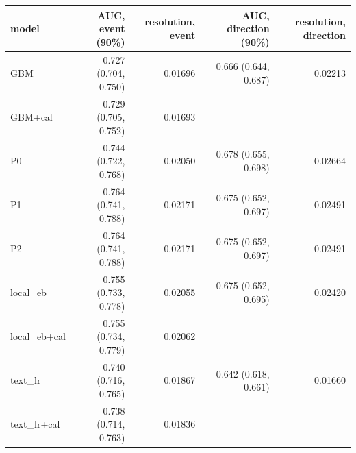 \begin{tabular}{lrrrr}
\toprule
model & AUC, event (90\%) & resolution, event & AUC, direction (90\%) & resolution, direction \\
\midrule
GBM & 0.727 (0.704, 0.750) & 0.01696 & 0.666 (0.644, 0.687) & 0.02213 \\
GBM+cal & 0.729 (0.705, 0.752) & 0.01693 &  &  \\
P0 & 0.744 (0.722, 0.768) & 0.02050 & 0.678 (0.655, 0.698) & 0.02664 \\
P1 & 0.764 (0.741, 0.788) & 0.02171 & 0.675 (0.652, 0.697) & 0.02491 \\
P2 & 0.764 (0.741, 0.788) & 0.02171 & 0.675 (0.652, 0.697) & 0.02491 \\
local\_eb & 0.755 (0.733, 0.778) & 0.02055 & 0.675 (0.652, 0.695) & 0.02420 \\
local\_eb+cal & 0.755 (0.734, 0.779) & 0.02062 &  &  \\
text\_lr & 0.740 (0.716, 0.765) & 0.01867 & 0.642 (0.618, 0.661) & 0.01660 \\
text\_lr+cal & 0.738 (0.714, 0.763) & 0.01836 &  &  \\
\bottomrule
\end{tabular}

